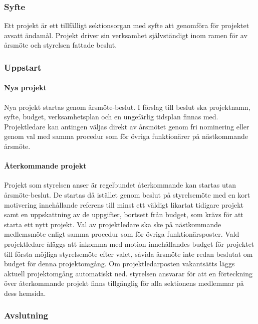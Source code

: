 \documentclass{dgovdoc}
\begin{document}
\subsubsection{Syfte}

Ett projekt är ett tillfälligt sektionsorgan med syfte att genomföra för
projektet avsatt ändamål. Projekt driver sin verksamhet självständigt inom
ramen för av årsmöte och styrelsen fattade beslut.

\subsubsection{Uppstart}

\paragraph{Nya projekt}

Nya projekt startas genom årsmöte-beslut. I förslag till beslut ska projektnamn,
syfte, budget, verksamhetsplan och en ungefärlig tidsplan finnas med.
Projektledare kan antingen väljas direkt av årsmötet genom fri nominering
eller genom val med samma procedur som för övriga funktionärer på
nästkommande årsmöte.

\paragraph{Återkommande projekt}

Projekt som styrelsen anser är regelbundet återkommande kan startas
utan årsmöte-beslut. De startas då istället genom beslut på styrelsemöte med en kort
motivering innehållande referens till minst ett väldigt likartat tidigare
projekt samt en uppskattning av de uppgifter, bortsett från budget, som krävs
för att starta ett nytt projekt. Val av projektledare ska ske på nästkommande
medlemsmöte enligt samma procedur som för övriga funktionärsposter. Vald projektledare
åläggs att inkomma med motion innehållandes budget för projektet till första
möjliga styrelsemöte efter valet, såvida årsmöte inte redan beslutat om budget för denna
projektomgång. Om projektledarposten vakantsätts läggs aktuell projektomgång
automatiskt ned. styrelsen ansvarar för att en förteckning över återkommande
projekt finns tillgänglig för alla sektionens medlemmar på dess hemsida.

\subsubsection{Avslutning}
\end{document}
